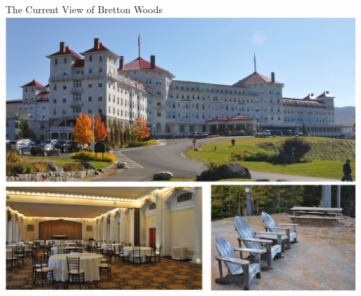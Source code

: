 \documentclass[10pt,hyperref={CJKbookmarks=true},xcolor=dvipsnames,aspectratio=169]{beamer}
\begin{document}
\begin{frame}{The Current View of Bretton Woods}
\centering
\includegraphics[scale=0.4]{fig/systems/bretton2}
\end{frame}
\end{document}
